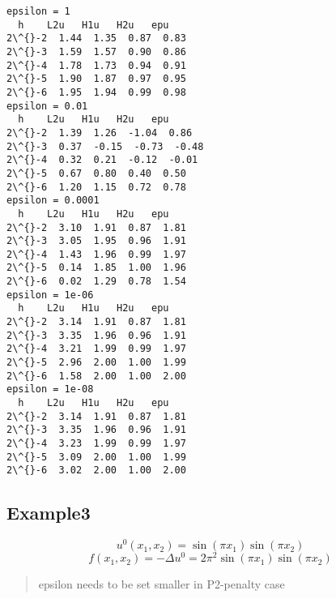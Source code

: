 \documentclass[11pt]{article}
\begin{document}
    \begin{Verbatim}[commandchars=\\\{\}]
epsilon = 1
  h    L2u   H1u   H2u   epu
2\^{}-2  1.44  1.35  0.87  0.83
2\^{}-3  1.59  1.57  0.90  0.86
2\^{}-4  1.78  1.73  0.94  0.91
2\^{}-5  1.90  1.87  0.97  0.95
2\^{}-6  1.95  1.94  0.99  0.98
epsilon = 0.01
  h    L2u   H1u   H2u   epu
2\^{}-2  1.39  1.26  -1.04  0.86
2\^{}-3  0.37  -0.15  -0.73  -0.48
2\^{}-4  0.32  0.21  -0.12  -0.01
2\^{}-5  0.67  0.80  0.40  0.50
2\^{}-6  1.20  1.15  0.72  0.78
epsilon = 0.0001
  h    L2u   H1u   H2u   epu
2\^{}-2  3.10  1.91  0.87  1.81
2\^{}-3  3.05  1.95  0.96  1.91
2\^{}-4  1.43  1.96  0.99  1.97
2\^{}-5  0.14  1.85  1.00  1.96
2\^{}-6  0.02  1.29  0.78  1.54
epsilon = 1e-06
  h    L2u   H1u   H2u   epu
2\^{}-2  3.14  1.91  0.87  1.81
2\^{}-3  3.35  1.96  0.96  1.91
2\^{}-4  3.21  1.99  0.99  1.97
2\^{}-5  2.96  2.00  1.00  1.99
2\^{}-6  1.58  2.00  1.00  2.00
epsilon = 1e-08
  h    L2u   H1u   H2u   epu
2\^{}-2  3.14  1.91  0.87  1.81
2\^{}-3  3.35  1.96  0.96  1.91
2\^{}-4  3.23  1.99  0.99  1.97
2\^{}-5  3.09  2.00  1.00  1.99
2\^{}-6  3.02  2.00  1.00  2.00
    \end{Verbatim}

    \subsection{Example3}\label{example3}

    \[
u^{0}\left(x_{1}, x_{2}\right)=\sin \left(\pi x_{1}\right) \sin \left(\pi x_{2}\right)
\] \[
f\left(x_{1}, x_{2}\right)=-\Delta u^{0}=2 \pi^{2} \sin \left(\pi x_{1}\right) \sin \left(\pi x_{2}\right)
\]

    \begin{quote}
epsilon needs to be set smaller in P2-penalty case
\end{quote}
\end{document}
